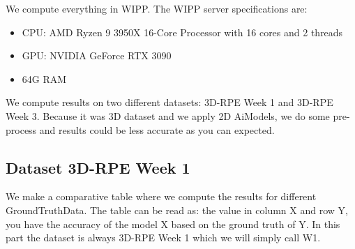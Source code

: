 We compute everything in \Gls{WIPP}. The \Gls{WIPP} server specifications are:
\begin{itemize}
  \item CPU: AMD Ryzen 9 3950X 16-Core Processor with 16 cores and 2 threads
  \item GPU: NVIDIA GeForce RTX 3090
  \item 64G RAM
\end{itemize}

We compute results on two different datasets: 3D-RPE Week 1 and 3D-RPE Week 3.
Because it was 3D dataset and we apply 2D \Gls{AiModel}s, we do some pre-process and
results could be less accurate as you can expected.

\subsection{Dataset 3D-RPE Week 1}


We make a comparative table where we compute the results for different
\Gls{GroundTruthData}. The table can be read as: the value in column X and
row Y, you have
the accuracy of the model X based on the ground truth of Y. In this part the
dataset is always 3D-RPE Week 1 which we will simply call W1.

